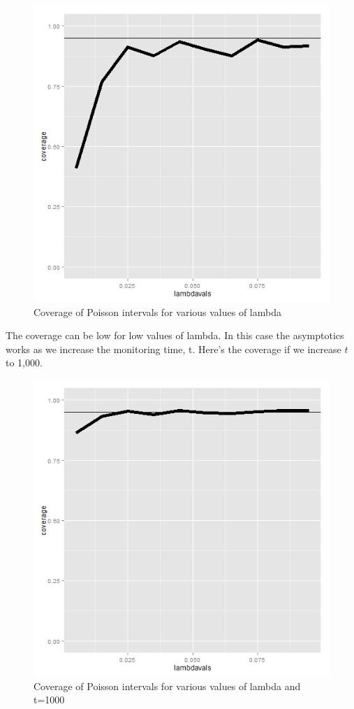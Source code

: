 \documentclass[]{article}
\begin{document}
\begin{figure}[htbp]
\centering
\includegraphics{LeanPub/images/poissonCoverage-1.png}
\caption{Coverage of Poisson intervals for various values of lambda}
\end{figure}

The coverage can be low for low values of lambda. In this case the
asymptotics works as we increase the monitoring time, t. Here's the
coverage if we increase $t$ to 1,000.

\begin{figure}[htbp]
\centering
\includegraphics{LeanPub/images/poissonCoverage2-1.png}
\caption{Coverage of Poisson intervals for various values of lambda and
t=1000}
\end{figure}
\end{document}
